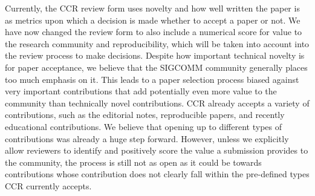 \documentclass[letterpaper]{article}
\begin{document}
\begin{multicols}{2}
Currently, the CCR review form uses novelty and how well written the paper is
as metrics upon which a decision is made whether to accept a paper or not. We
have now changed the review form to also include a numerical score for value to
the research community and reproducibility, which will be taken into account
into the review process to make decisions. Despite how important technical
novelty is for paper acceptance, we believe that the SIGCOMM community
generally places too much emphasis on it. This leads to a paper selection
process biased against very important contributions that add potentially even
more value to the community than technically novel contributions. CCR already
accepts a variety of contributions, such as the editorial notes, reproducible
papers, and recently educational contributions. We believe that opening up to
different types of contributions was already a huge step forward. However,
unless we explicitly allow reviewers to identify and positively score the value
a submission provides to the community, the process is still not as open as it
could be towards contributions whose contribution does not clearly fall within
the pre-defined types CCR currently accepts.








\vspace{1cm}
\hfill
\begin{minipage}{.7\columnwidth}
\begin{flushright}                                      
\end{flushright} 
\end{minipage}

\end{multicols}
\end{document}
